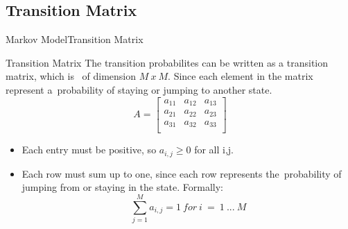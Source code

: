 \documentclass[10pt]{beamer}
\begin{document}
\subsection{Transition Matrix}
\begin{frame}{Markov Model}{Transition Matrix}
  \begin{block}{Transition Matrix}
  The transition probabilites can be written as a transition matrix, which is \
  of dimension $M\ x\ M$. Since each element in the matrix represent a\
  probability of staying or jumping to another state. \cite{Anders}
        \begin{equation}
            A = 
            \begin{bmatrix}
                a_{11} & a_{12} & a_{13}\\
                a_{21} & a_{22} & a_{23}\\
                a_{31} & a_{32} & a_{33}\\
            \end{bmatrix}
        \end{equation}
  \end{block}
  \begin{itemize}
      \item Each entry must be positive, so $a_{i,j} \geqslant 0$ for all i,j.
      \item Each row must sum up to one, since each row represents the\
            probability of jumping from or staying in the state. Formally: \\
            \begin{equation}
               \sum_{j=1}^{M}a_{i,j} = 1\ for\ i\ =\ 1\ ...\ M
            \end{equation} 
  \end{itemize}
\end{frame}

\end{document}
